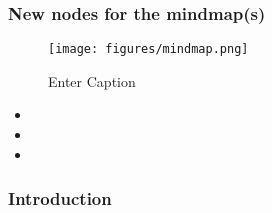 \documentclass[10pt,letterpaper]{article}
\newcommand{\bi}{\begin{itemize}}
\newcommand{\ei}{\end{itemize}}
\begin{document}
\subsubsection{New nodes for the mindmap(s)}
%
%
%
%

\begin{figure}
    \centering
    \texttt{[image: figures/mindmap.png]}
    \caption{Enter Caption}
    \label{fig:enter-label}
\end{figure}


\bi
    \item  
    \item  
    \item  
\ei


\subsubsection{Introduction}
\label{ssubsec:new-ideas:Intro}
\end{document}
